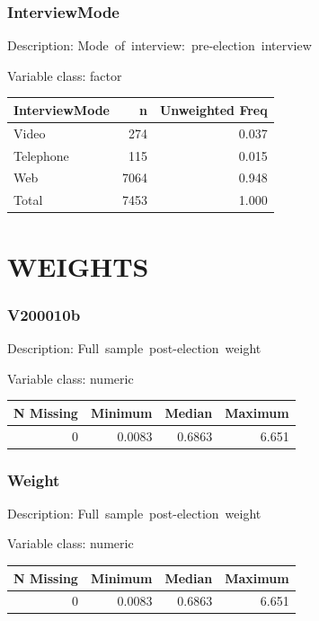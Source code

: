 \documentclass[
]{krantz}
\begin{document}
\hypertarget{interviewmode}{%
\subsubsection*{InterviewMode}\label{interviewmode}}


Description: Mode~of~interview:~pre-election~interview

Variable class: factor

\begin{tabular}[t]{l|r|r}
\hline
InterviewMode & n & Unweighted Freq\\
\hline
Video & 274 & 0.037\\
\hline
Telephone & 115 & 0.015\\
\hline
Web & 7064 & 0.948\\
\hline
Total & 7453 & 1.000\\
\hline
\end{tabular}

\hypertarget{weights}{%
\section{WEIGHTS}\label{weights}}

\hypertarget{v200010b}{%
\subsubsection*{V200010b}\label{v200010b}}


Description: Full~sample~post-election~weight

Variable class: numeric

\begin{tabular}[t]{r|r|r|r}
\hline
N Missing & Minimum & Median & Maximum\\
\hline
0 & 0.0083 & 0.6863 & 6.651\\
\hline
\end{tabular}

\hypertarget{weight}{%
\subsubsection*{Weight}\label{weight}}


Description: Full~sample~post-election~weight

Variable class: numeric

\begin{tabular}[t]{r|r|r|r}
\hline
N Missing & Minimum & Median & Maximum\\
\hline
0 & 0.0083 & 0.6863 & 6.651\\
\hline
\end{tabular}
\end{document}
